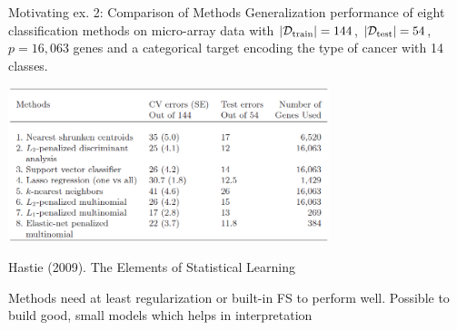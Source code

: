 \documentclass[11pt,compress,t,notes=noshow, xcolor=table]{beamer}
\begin{document}
  \begin{vbframe}{Motivating ex. 2: Comparison of Methods}
  Generalization performance of eight classification methods on micro-array data with $| \mathcal{D}_{\text{train}} | = 144$, $| \mathcal{D}_{\text{test}} | = 54$, $p=16, 063$ genes and a categorical target encoding the type of cancer with 14 classes.
\vspace{0.25cm}
  \begin{center}
  \includegraphics[width=0.7\textwidth]{figure_man/tibshirani_tab_18_1.png}

  \footnotesize{Hastie (2009). The Elements of Statistical Learning}
  \end{center}
  Methods need at least regularization or built-in FS to perform well. Possible to build good, small models which helps in interpretation
  \end{vbframe}
\end{document}
